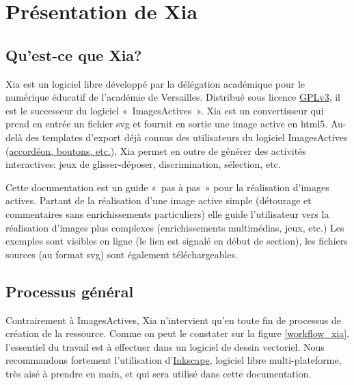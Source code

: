 \documentclass[a4paper,12pt]{report}
\begin{document}
 
 
\section{Présentation de Xia}

\subsection{Qu'est-ce que Xia?}

Xia est un logiciel libre développé par la délégation académique pour le numérique éducatif de l'académie de Versailles.
Distribué sous licence \href{http://www.gnu.org/copyleft/gpl.html}{GPLv3}, il est le successeur du logiciel «~ImagesActives~».
Xia est un convertisseur qui prend en entrée un fichier svg et fournit en sortie une image active en html5.
Au-delà des templates d'export déjà connus des utilisateurs du logiciel ImagesActives
(\href{http://images-actives.crdp-versailles.fr/spip.php?article11&lang=fr}{accordéon, boutons, etc.}),
Xia permet en outre de générer des activités interactives: jeux de glisser-déposer, discrimination, sélection, etc.

Cette documentation est un guide «~pas à pas~» pour la réalisation d'images actives.
Partant de la réalisation d'une image active simple (détourage et commentaires sans enrichissements particuliers)
elle guide l'utilisateur vers la réalisation d'images plus complexes (enrichissements multimédias, jeux, etc.)
Les exemples sont visibles en ligne (le lien est signalé en début de section), les fichiers sources (au format svg) 
sont également téléchargeables.

\subsection{Processus général}

Contrairement à ImagesActives, Xia n'intervient qu'en toute fin de processus de création de la ressource.
Comme on peut le constater sur la figure \ref{workflow_xia}, l'essentiel du travail est à effectuer
dans un logiciel de dessin vectoriel.
Nous recommandons fortement l'utilisation d'\href{http://www.inkscape.org/}{Inkscape}, logiciel libre
multi-plateforme, très aisé à prendre en main, et qui sera utilisé dans cette documentation.
\end{document}
